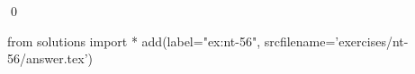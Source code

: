 
\begin{ex} 
  \label{ex:nt-56}
  
  \qed
\end{ex} 
\begin{python0}
from solutions import *
add(label="ex:nt-56",
    srcfilename='exercises/nt-56/answer.tex') 
\end{python0}
